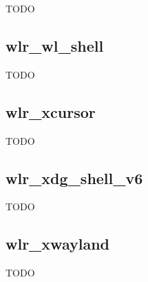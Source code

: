 \documentclass{article}
\begin{document}
TODO

\subsection{wlr_wl_shell}\label{wlr wl shell}

TODO

\subsection{wlr_xcursor}\label{wlr xcursor}

TODO

\subsection{wlr_xdg_shell_v6}\label{wlr xdg shell v6}

TODO

\subsection{wlr_xwayland}\label{wlr xwayland}

TODO
\end{document}

